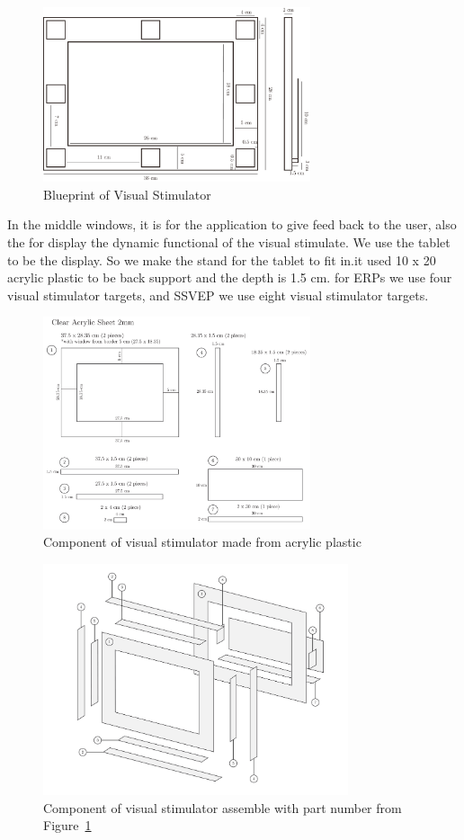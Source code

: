 \begin{figure}[H]
	\centering
	\includegraphics[width=0.7\textwidth]{chapter6/blueprint.pdf}
	\caption{Blueprint of Visual Stimulator}
\end{figure}
In the middle windows, it is for the application to give feed back to the user, also the for display the dynamic functional of the visual stimulate. We use the tablet to be the display. So we make the stand for the tablet to fit in.it used 10 x 20 acrylic plastic to be back support and the depth is 1.5 cm. for ERPs we use four visual stimulator targets, and SSVEP we use eight visual stimulator targets. 
\begin{figure}[H]
	\centering
	\includegraphics[width=0.7\textwidth]{chapter6/sch.pdf}
	\caption{Component of visual stimulator made from acrylic plastic}
	\label{fig:sch}
\end{figure}

\begin{figure}[H]
	\centering
	\includegraphics[width=0.8\textwidth]{chapter6/component.pdf}
	\caption{Component of visual stimulator assemble with part number from Figure~\ref{fig:sch} }
\end{figure}

